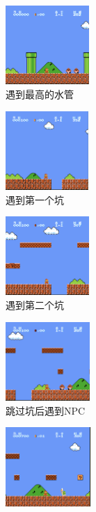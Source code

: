 \begin{figure}[!htp]
  \begin{subfigure}{3cm}
      \centering
      \includegraphics[height=3cm]{static/e.png}
      \caption{遇到最高的水管}
  \end{subfigure}
  \hspace{1em}
  \begin{subfigure}{3cm}
    \centering
    \includegraphics[height=3cm]{static/f.png}
    \caption{遇到第一个坑}
  \end{subfigure}
  \hspace{1em}
  \begin{subfigure}{3cm}
    \centering
    \includegraphics[height=3cm]{static/g.png}
    \caption{遇到第二个坑}
  \end{subfigure}
  \hspace{1em}
  \begin{subfigure}{3cm}
    \centering
    \includegraphics[height=3cm]{static/h.png}
    \caption{跳过坑后遇到NPC}
  \end{subfigure}
  \begin{subfigure}{3cm}
      \centering
      \includegraphics[height=3cm]{static/i.png}

\end{subfigure}
\end{figure}
